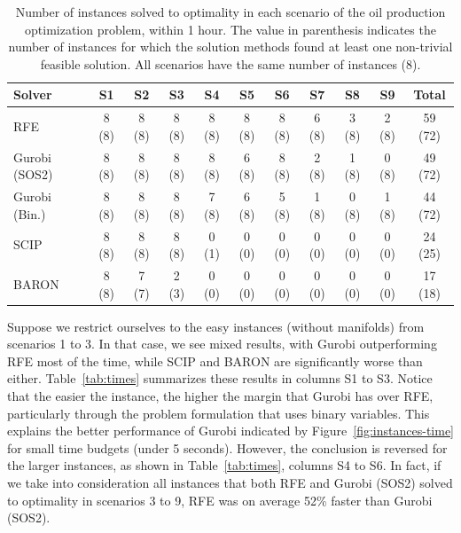 \documentclass[pdflatex,sn-mathphys-num]{sn-jnl}%
\newcommand{\new}[1]{#1}
\begin{document}
\begin{table}[ht]
\centering
\caption{\new{Number of instances solved to optimality in each scenario of the oil production optimization problem, within 1 hour. The value in parenthesis indicates the number of instances for which the solution methods found at least one non-trivial feasible solution. All scenarios have the same number of instances (8).}} \label{tab:instances-solved}
\new{%
\begin{tabular}{l
                cccccccccc}
\toprule
Solver & S1 & S2 & S3 & S4 & S5 & S6 & S7 & S8 & S9 & Total \\
\midrule
RFE              & 8 (8) & 8 (8) & 8 (8) & 8 (8) & 8 (8) & 8 (8) & 6 (8) & 3 (8) & 2 (8) & 59 (72) \\
Gurobi (SOS2)    & 8 (8) & 8 (8) & 8 (8) & 8 (8) & 6 (8) & 8 (8) & 2 (8) & 1 (8) & 0 (8) & 49 (72) \\
Gurobi (Bin.)    & 8 (8) & 8 (8) & 8 (8) & 7 (8) & 6 (8) & 5 (8) & 1 (8) & 0 (8) & 1 (8) & 44 (72) \\
SCIP             & 8 (8) & 8 (8) & 8 (8) & 0 (1) & 0 (0) & 0 (0) & 0 (0) & 0 (0) & 0 (0) & 24 (25) \\
BARON            & 8 (8) & 7 (7) & 2 (3) & 0 (0) & 0 (0) & 0 (0) & 0 (0) & 0 (0) & 0 (0) & 17 (18) \\
\bottomrule
\end{tabular}}
\end{table}

\new{%
Suppose we restrict ourselves to the easy instances (without manifolds) from scenarios 1 to 3. In that case, we see mixed results, with Gurobi outperforming RFE most of the time, while SCIP and BARON are significantly worse than either.
Table~\ref{tab:times} summarizes these results in columns S1 to S3.
Notice that the easier the instance, the higher the margin that Gurobi has over RFE, particularly through the problem formulation that uses binary variables.
This explains the better performance of Gurobi indicated by Figure~\ref{fig:instances-time} for small time budgets (under 5 seconds).
However, the conclusion is reversed for the larger instances, as shown in Table~\ref{tab:times}, columns S4 to S6.
In fact, if we take into consideration all instances that both RFE and Gurobi (SOS2) solved to optimality in scenarios 3 to 9, RFE was on average 52\% faster than Gurobi (SOS2).
}
\end{document}

